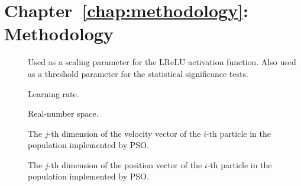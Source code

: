 \begin{description}
	\item [\parbox{2cm}{$E[\theta_{k}]$}]
	\item [\parbox{2cm}{$h_{i,k}$}]
	\item [\parbox{2cm}{$h_{i}$}]
	\item [\parbox{2cm}{$h_{k}$}]
	\item [\parbox{2cm}{$i$}]
	\item [\parbox{2cm}{$I$}]
	\item [\parbox{2cm}{$j$}]
	\item [\parbox{2cm}{$J$}]
	\item [\parbox{2cm}{$K-1$}]
	\item [\parbox{2cm}{$k$}]
	\item [\parbox{2cm}{$K$}]
	\item [\parbox{2cm}{$L$}]
	\item [\parbox{2cm}{$LSE$}]
	\item [\parbox{2cm}{$Mult$}]
	\item [\parbox{2cm}{$N_{0,k}$}]
	\item [\parbox{2cm}{$N_{1,k}$}]
	\item [\parbox{2cm}{$N_{j,k}$}]
	\item [\parbox{2cm}{$N_{j}$}]
	\item [\parbox{2cm}{$N_{k}$}]
	\item [\parbox{2cm}{$N$}]
	\item [\parbox{2cm}{$S$}]
	\item [\parbox{2cm}{$t$}]
\end{description}

\section{Chapter~\ref{chap:methodology}: Methodology}
\label{sec:symbols:methodology}

\begin{description}
	\item [\parbox{2cm}{$\alpha$}] Used as a scaling parameter for the \acs{LReLU} activation function. Also used as a threshold parameter for the statistical significance tests.
	\item [\parbox{2cm}{$\eta$}] Learning rate.
	\item [\parbox{2cm}{$\mathbb{R}$}] Real-number space.
	\item [\parbox{2cm}{$v_{ij}$}] The $j$-th dimension of the velocity vector of the $i$-th particle in the population implemented by \acs{PSO}.
	\item [\parbox{2cm}{$x_{ij}$}] The $j$-th dimension of the position vector of the $i$-th particle in the population implemented by \acs{PSO}.
\end{description}

